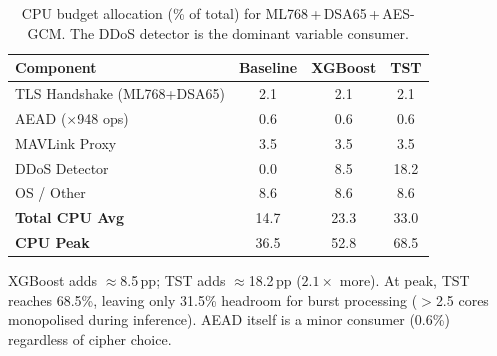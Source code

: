 \begin{table}[!t]
\centering
\caption{CPU budget allocation (\% of total)
  for ML768\,+\,DSA65\,+\,AES-GCM.
  The DDoS detector is the dominant variable consumer.}
\label{tab:cpu_budget}
\footnotesize
\setlength{\tabcolsep}{3pt}
\begin{tabular}{@{}l
  S[table-format=2.1]
  S[table-format=2.1]
  S[table-format=2.1]@{}}
\toprule
\textbf{Component}
  & {\textbf{Baseline}}
  & {\textbf{XGBoost}}
  & {\textbf{TST}} \\
\midrule
TLS Handshake (ML768+DSA65) & 2.1  & 2.1  & 2.1  \\
AEAD ($\times$948 ops)       & 0.6  & 0.6  & 0.6  \\
MAVLink Proxy                & 3.5  & 3.5  & 3.5  \\
DDoS Detector                & 0.0  & 8.5  & 18.2 \\
OS / Other                   & 8.6  & 8.6  & 8.6  \\
\midrule
\textbf{Total CPU Avg}       & 14.7 & 23.3 & 33.0 \\
\textbf{CPU Peak}            & 36.5 & 52.8 & 68.5 \\
\bottomrule
\end{tabular}
\begin{tablenotes}
\footnotesize
\item XGBoost adds $\approx$8.5\,pp; TST adds $\approx$18.2\,pp
  ($2.1\times$ more).  At peak, TST reaches 68.5\%, leaving only
  31.5\% headroom for burst processing ($>$2.5 cores monopolised
  during inference).  AEAD itself is a minor consumer (0.6\%)
  regardless of cipher choice.
\end{tablenotes}
\end{table}

